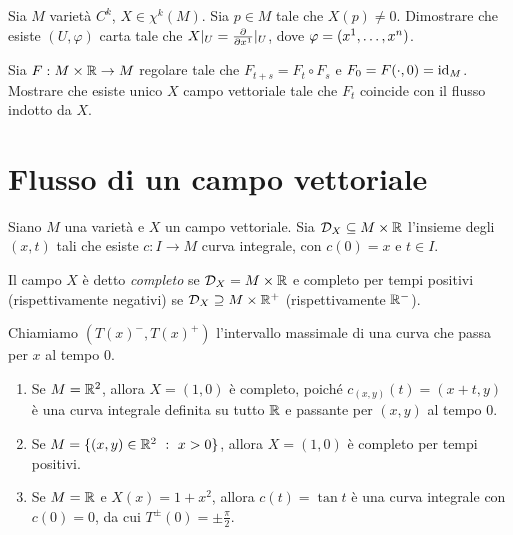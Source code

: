 \begin{exercise}
	Sia $M$ varietà $C^k$, $X\in\chi^k(M)$. Sia $p\in M$ tale che $X(p)\not=0$. Dimostrare che esiste $(U,\varphi)$ carta tale che $X\restrict U=\frac{\partial}{\partial x^1}\restrict U$, dove $\varphi=(\seqa xn,)$.
\end{exercise}	

\begin{exercise}
	Sia $F:M\times\R\to M$ regolare tale che $F_{t+s}=F_t\circ F_s$ e $F_0=F(\cdot,0)=\id_M$. Mostrare che esiste unico $X$ campo vettoriale tale che $F_t$ coincide con il flusso indotto da $X$.
\end{exercise}

\section{Flusso di un campo vettoriale} %

\begin{definition}  
	Siano $M$ una varietà e $X$ un campo vettoriale. Sia $\mathcal D_X\subseteq M\times \R$ l'insieme degli $(x,t)$ tali che esiste $c:I\to M$ curva integrale, con $c(0)=x$ e $t \in I$.
	
	Il campo $X$ è detto \emph{completo} se $\mathcal D_X=M\times \R$ e completo per tempi positivi (rispettivamente negativi) se $\mathcal D_X\supseteq M\times\R^+$ (rispettivamente $\R^-$).
	
	Chiamiamo $(T(x)^-,T(x)^+)$ l'intervallo massimale di una curva che passa per $x$ al tempo 0. 
\end{definition}

\begin{example}
\begin{enumerate}
	\item Se $M=\R^2$, allora $X=(1,0)$ è completo, poiché $c_{(x,y)}(t)=(x+t,y)$ è una curva integrale definita su tutto $\R$ e passante per $(x,y)$ al tempo 0.
	\item Se $M=\{(x,y) \in \R^2 \suchthat x>0\}$, allora $X=(1,0)$ è completo per tempi positivi.
	\item Se $M=\R$ e $X(x)=1+x^2$, allora $c(t)=\tan t$ è una curva integrale con $c(0)=0$, da cui $T^\pm(0)=\pm \frac \pi 2$.
\end{enumerate}
\end{example}

